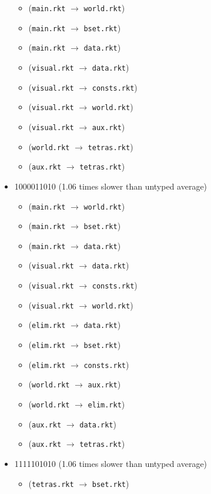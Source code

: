 \documentclass{article}
\newcommand{\mono}[1]{\texttt{#1}}
\begin{document}
\begin{itemize}
\begin{itemize}
  \item (\mono{main.rkt} $\rightarrow$ \mono{world.rkt})
  \item (\mono{main.rkt} $\rightarrow$ \mono{bset.rkt})
  \item (\mono{main.rkt} $\rightarrow$ \mono{data.rkt})
  \item (\mono{visual.rkt} $\rightarrow$ \mono{data.rkt})
  \item (\mono{visual.rkt} $\rightarrow$ \mono{consts.rkt})
  \item (\mono{visual.rkt} $\rightarrow$ \mono{world.rkt})
  \item (\mono{visual.rkt} $\rightarrow$ \mono{aux.rkt})
  \item (\mono{world.rkt} $\rightarrow$ \mono{tetras.rkt})
  \item (\mono{aux.rkt} $\rightarrow$ \mono{tetras.rkt})
  \end{itemize}
\item 1000011010 (1.06 times slower than untyped average)
  \begin{itemize}
  \item (\mono{main.rkt} $\rightarrow$ \mono{world.rkt})
  \item (\mono{main.rkt} $\rightarrow$ \mono{bset.rkt})
  \item (\mono{main.rkt} $\rightarrow$ \mono{data.rkt})
  \item (\mono{visual.rkt} $\rightarrow$ \mono{data.rkt})
  \item (\mono{visual.rkt} $\rightarrow$ \mono{consts.rkt})
  \item (\mono{visual.rkt} $\rightarrow$ \mono{world.rkt})
  \item (\mono{elim.rkt} $\rightarrow$ \mono{data.rkt})
  \item (\mono{elim.rkt} $\rightarrow$ \mono{bset.rkt})
  \item (\mono{elim.rkt} $\rightarrow$ \mono{consts.rkt})
  \item (\mono{world.rkt} $\rightarrow$ \mono{aux.rkt})
  \item (\mono{world.rkt} $\rightarrow$ \mono{elim.rkt})
  \item (\mono{aux.rkt} $\rightarrow$ \mono{data.rkt})
  \item (\mono{aux.rkt} $\rightarrow$ \mono{tetras.rkt})
  \end{itemize}
\item 1111101010 (1.06 times slower than untyped average)
  \begin{itemize}
  \item (\mono{tetras.rkt} $\rightarrow$ \mono{bset.rkt})

\end{itemize}
\end{itemize}
\end{document}
